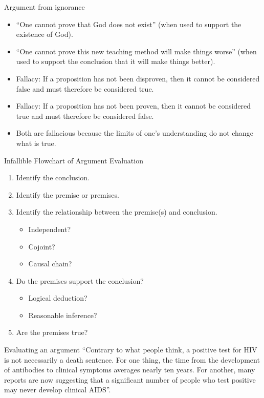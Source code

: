 \documentclass{beamer}
\begin{document}
\begin{frame}{Argument from ignorance}
\begin{itemize}
\item ``One cannot prove that God does not exist'' (when used to support the existence of God).
\item ``One cannot prove this new teaching method will make things worse'' (when used to support the conclusion that it will make things better). 
\item Fallacy: If a proposition has not been disproven, then it cannot be considered false and must therefore be considered true.
\item Fallacy: If a proposition has not been proven, then it cannot be considered true and must therefore be considered false.
\item Both are fallacious because the limits of one's understanding do not change what is true.
\end{itemize}
\end{frame}



\begin{frame}{Infallible Flowchart of Argument Evaluation}
\begin{enumerate}
\item Identify the conclusion.
\item Identify the premise or premises.
\item Identify the relationship between the premise(s) and conclusion.
\begin{itemize}
\item Independent?
\item Cojoint?
\item Causal chain?
\end{itemize}
\item Do the premises support the conclusion?
\begin{itemize}
\item Logical deduction?
\item Reasonable inference?
\end{itemize}
\item Are the premises true?
\end{enumerate}
\end{frame}


\begin{frame}{Evaluating an argument}
``Contrary to what people think, a positive test for HIV is not necessarily a death sentence. For one thing, the time from the development of antibodies to clinical symptoms averages nearly ten years. For another, many reports are now suggesting that a significant number of people who test positive may never develop clinical AIDS''.
\end{frame}
\end{document}
